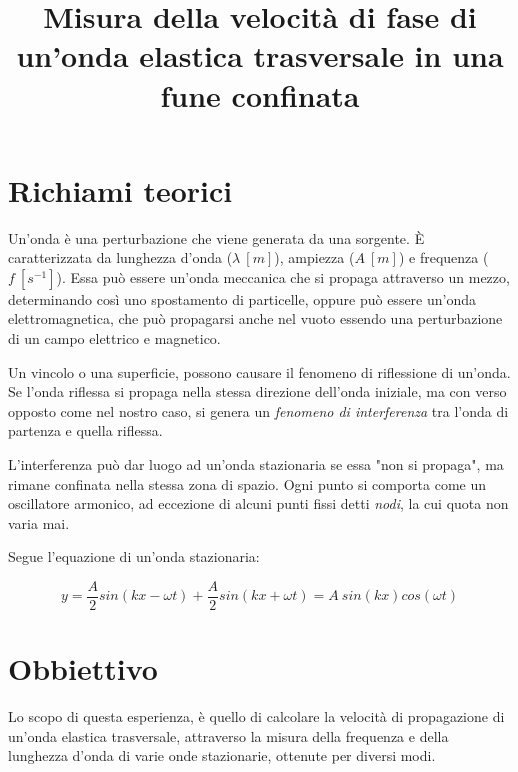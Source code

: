 \documentclass[12pt, a4paper]{article}
\title{\textbf{Misura della velocità di fase di un’onda
elastica trasversale in una fune confinata}}
\date{}
\begin{document}
\maketitle
{}%



\section{Richiami teorici}
Un'onda è una perturbazione che viene generata da una sorgente. È caratterizzata da lunghezza d'onda ($\lambda \ [m]$), ampiezza ($A\  [m]$) e frequenza ($f \ [s^{-1}]$).
Essa può essere un'onda meccanica che si propaga attraverso un mezzo, determinando così uno spostamento di particelle, oppure può essere un'onda elettromagnetica, che può propagarsi anche nel vuoto essendo una perturbazione di un campo elettrico e magnetico.
\bigskip

Un vincolo o una superficie, possono causare il fenomeno di riflessione di un'onda. 
Se l'onda riflessa si propaga nella stessa direzione dell'onda iniziale, ma con verso opposto come nel nostro caso, si genera un\textit{ fenomeno di interferenza} tra l'onda di partenza e quella riflessa.
\bigskip

 L'interferenza può dar luogo ad un'onda stazionaria se essa "non si propaga", ma rimane confinata nella stessa zona di spazio.  Ogni punto si comporta come un oscillatore armonico, ad eccezione di alcuni punti fissi detti \textit{nodi}, la cui quota non varia mai.
 
Segue l'equazione di un'onda stazionaria:

\begin{equation*}
    y = \frac{A}{2} sin(kx - \omega t) + \frac{A}{2} sin(kx + \omega t) = A\  sin(kx)cos(\omega t)
\end{equation*}




\addvspace{2cm}
\section{Obbiettivo}
Lo scopo di questa esperienza, è quello di calcolare la velocità di propagazione di un'onda elastica trasversale, attraverso la misura della frequenza e della lunghezza d'onda di varie onde stazionarie, ottenute per diversi modi.
\end{document}
